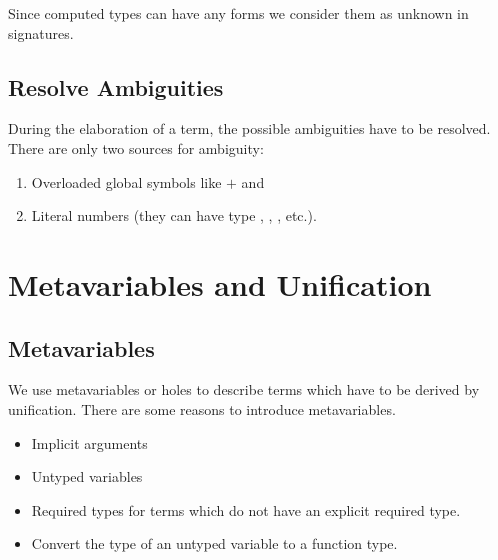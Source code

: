 Since computed types can have any forms we consider them as unknown in
signatures.










\subsection{Resolve Ambiguities}

During the elaboration of a term, the possible ambiguities have to be resolved.
There are only two sources for ambiguity:
%
\begin{enumerate}

\item Overloaded global symbols like $+$ and 

\item Literal numbers (they can have type , ,
, etc.).

\end{enumerate}








\section{Metavariables and Unification}

\subsection{Metavariables}

We use metavariables or holes to describe terms which have to be derived by
unification. There are some reasons to introduce metavariables.

\begin{itemize}

\item Implicit arguments

\item Untyped variables

\item Required types for terms which do not have an explicit required type.

\item Convert the type of an untyped variable to a function type.

\end{itemize}


